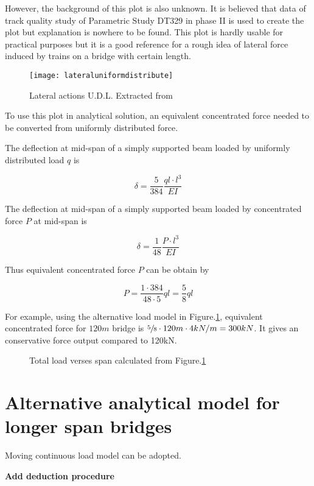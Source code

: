 However, the background of this plot is also unknown. It is believed that data of track quality study of Parametric Study DT329\cite{d181dt329} in phase II is used to create the plot but explanation is nowhere to be found. This plot is hardly usable for practical purposes but it is a good reference for a rough idea of lateral force induced by trains on a bridge with certain length.

\begin{figure}[h!]
    \centering
    \texttt{[image: lateraluniformdistribute]}
    \caption{Lateral actions U.D.L. Extracted from \cite[Figure.4.1]{d181} }
    \label{fig:lateralUDL}
\end{figure}

To use this plot in analytical solution, an equivalent concentrated force needed to be converted from uniformly distributed force.

The deflection at mid-span of a simply supported beam loaded by uniformly distributed load $q$ is

$$ \delta = \frac{5}{384} \frac{ql\cdot l^3}{EI} $$

The deflection at mid-span of a simply supported beam loaded by concentrated force $P$ at mid-span is

$$ \delta = \frac{1}{48} \frac{P\cdot l^3}{EI} $$

Thus equivalent concentrated force $P$ can be obtain by 

$$P = \frac{1 \cdot 384}{48 \cdot 5} ql = \frac{5}{8}ql$$

For example, using the alternative load model in Figure.\ref{fig:lateralUDL}, equivalent concentrated force for $120m$ bridge is $\sfrac{5}{8}\cdot 120m \cdot 4kN/m=300kN$. It gives an conservative force output compared to 120kN.

\begin{figure}[h!]
\centering 
\setlength\figureheight{6cm} 
\setlength\figurewidth{6cm} 
 
\caption{Total load verses span calculated from Figure.\ref{fig:lateralUDL}} 
\label{fig:UDL2CL} 
\end{figure}


\section{Alternative analytical model for longer span bridges}
Moving continuous load model can be adopted.

\textbf{Add deduction procedure}

